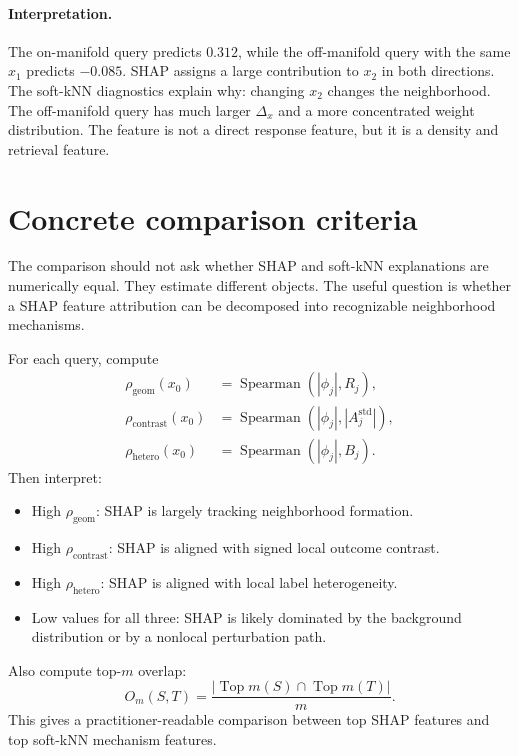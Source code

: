 \documentclass[11pt]{article}
\newcommand{\1}{\mathbf{1}}
\begin{document}
\paragraph{Interpretation.} The on-manifold query predicts $0.312$, while the off-manifold query with the same $x_1$ predicts $-0.085$. SHAP assigns a large contribution to $x_2$ in both directions. The soft-kNN diagnostics explain why: changing $x_2$ changes the neighborhood. The off-manifold query has much larger $\Delta_x$ and a more concentrated weight distribution. The feature is not a direct response feature, but it is a density and retrieval feature.

\section{Concrete comparison criteria}

The comparison should not ask whether SHAP and soft-kNN explanations are numerically equal. They estimate different objects. The useful question is whether a SHAP feature attribution can be decomposed into recognizable neighborhood mechanisms.

For each query, compute
\begin{align}
\rho_{\mathrm{geom}}(x_0) &= \operatorname{Spearman}(|\phi_j|, R_j), \\
\rho_{\mathrm{contrast}}(x_0) &= \operatorname{Spearman}(|\phi_j|, |A_j^{\mathrm{std}}|), \\
\rho_{\mathrm{hetero}}(x_0) &= \operatorname{Spearman}(|\phi_j|, B_j).
\end{align}
Then interpret:
\begin{itemize}[leftmargin=*]
    \item High $\rho_{\mathrm{geom}}$: SHAP is largely tracking neighborhood formation.
    \item High $\rho_{\mathrm{contrast}}$: SHAP is aligned with signed local outcome contrast.
    \item High $\rho_{\mathrm{hetero}}$: SHAP is aligned with local label heterogeneity.
    \item Low values for all three: SHAP is likely dominated by the background distribution or by a nonlocal perturbation path.
\end{itemize}

Also compute top-$m$ overlap:
\[
O_m(S,T)=\frac{|\operatorname{Top}m(S)\cap\operatorname{Top}m(T)|}{m}.
\]
This gives a practitioner-readable comparison between top SHAP features and top soft-kNN mechanism features.
\end{document}
